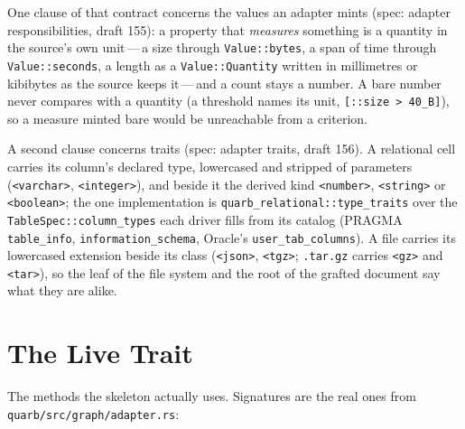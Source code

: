 \documentclass{report}
\begin{document}
One clause of that contract concerns the values an adapter mints
(spec: adapter responsibilities, draft 155): a property that
\emph{measures} something is a quantity in the source's own unit\,---\,a
size through \texttt{Value::bytes}, a span of time through
\texttt{Value::seconds}, a length as a \texttt{Value::Quantity} written
in millimetres or kibibytes as the source keeps it\,---\,and a count
stays a number. A bare number never compares with a quantity (a
threshold names its unit, \texttt{[::size > 40\_B]}), so a measure
minted bare would be unreachable from a criterion.

A second clause concerns traits (spec: adapter traits, draft 156). A
relational cell carries its column's declared type, lowercased and
stripped of parameters (\texttt{<varchar>}, \texttt{<integer>}), and
beside it the derived kind \texttt{<number>}, \texttt{<string>} or
\texttt{<boolean>}; the one implementation is
\texttt{quarb\_relational::type\_traits} over the
\texttt{TableSpec::column\_types} each driver fills from its catalog
(PRAGMA \texttt{table\_info}, \texttt{information\_schema}, Oracle's
\texttt{user\_tab\_columns}). A file carries its lowercased extension
beside its class (\texttt{<json>}, \texttt{<tgz>}; \texttt{.tar.gz}
carries \texttt{<gz>} and \texttt{<tar>}), so the leaf of the file
system and the root of the grafted document say what they are alike.

\section{The Live Trait}

The methods the skeleton actually uses. Signatures are the real ones
from \texttt{quarb/src/graph/adapter.rs}:
\end{document}
